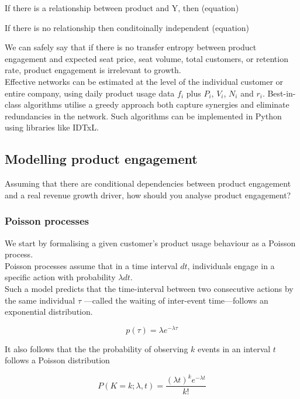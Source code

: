 \documentclass{article}
\begin{document}
If there is a relationship between product and Y, then (equation)

If there is no relationship then conditoinally independent (equation)

We can safely say that if there is no transfer entropy between product engagement and expected seat price, seat volume, total customers, or retention rate, product engagement is irrelevant to growth. \\

Effective networks can be estimated at the level of the individual customer or entire company, using daily product usage data $f_i$ plus $P_i$, $V_i$, $N_i$ and $r_i$. Best-in-class algorithms utilise a greedy approach both capture synergies and eliminate redundancies in the network. Such algorithms can be implemented in Python using libraries like IDTxL.


\subsection{Modelling product engagement}

Assuming that there are conditional dependencies between product engagement and a real revenue growth driver, how should you analyse product engagement? \\



\subsubsection{Poisson processes}


We start by formalising a given customer's product usage behaviour as a Poisson process. \\

Poisson processes assume that in a time interval $dt$, individuals engage in a specific action with probability $\lambda dt$.  \\

Such a model predicts that the time-interval between two consecutive actions by the same individual $\tau$ —called the waiting of inter-event time—follows an exponential distribution.

$$p(\tau) = \lambda e^{-\lambda \tau}$$

It also follows that the the probability of observing $k$ events in an interval $t$ follows a Poisson distribution

\[
P(K = k; \lambda, t) = \frac{(\lambda t)^k e^{-\lambda t}}{k!}
\]
\end{document}
